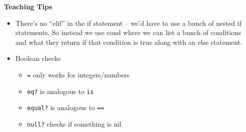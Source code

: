 \begin{blocksection}
\begin{guide}
\textbf{Teaching Tips}
\begin{itemize}
    \item There’s no “elif” in the if statement -- we’d have to use a bunch of nested if statements. So instead we use cond where we can list a bunch of conditions and what they return if that condition is true along with an else statement.
    \item Boolean checks
        \begin{itemize}
        \item \lstinline{=} only works for integers/numbers
        \item \lstinline{eq?} is analogous to \lstinline{is}
        \item \lstinline{equal?} is analogous to \lstinline{==}
        \item \lstinline{null?} checks if something is nil
        \end{itemize}
\end{itemize}
\end{guide}
\end{blocksection}